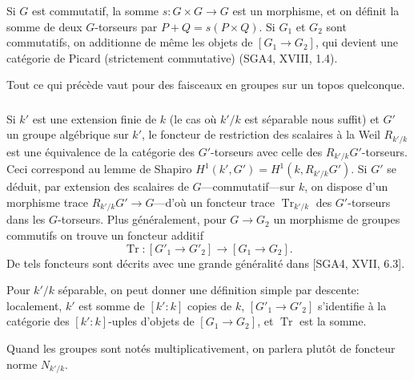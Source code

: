 \documentclass[12pt,a4paper]{article}
\theoremstyle{plain}
\theoremstyle{definition}
\theoremstyle{remark}
\DeclareMathOperator{\Tr}{Tr}
\begin{document}
Si $G$ est commutatif, la somme $s: G \times G \to G$ est un morphisme, et on d\'efinit la somme de deux $G$-torseurs par $P + Q = s(P \times Q)$. Si $G_1$ et $G_2$ sont commutatifs, on additionne de m\^eme les objets de $[G_1 \to G_2]$, qui devient une cat\'egorie de Picard (strictement commutative) (SGA4, XVIII, 1.4).

Tout ce qui pr\'ec\`ede vaut pour des faisceaux en groupes sur un topos quelconque.

\subsubsection{}

Si $k'$ est une extension finie de $k$ (le cas o\`u $k'/k$ est s\'eparable nous suffit) et $G'$ un groupe alg\'ebrique sur $k'$, le foncteur de restriction des scalaires \`a la Weil $R_{k'/k}$ est une \'equivalence de la cat\'egorie des $G'$-torseurs avec celle des $R_{k'/k}G'$-torseurs. Ceci correspond au lemme de Shapiro $H^1(k',G') = H^1(k,R_{k'/k}G')$. Si $G'$ se d\'eduit, par extension des scalaires de $G$---commutatif---sur $k$, on dispose d'un morphisme trace $R_{k'/k}G' \to G$---d'o\`u un foncteur trace $\Tr_{k'/k}$ des $G'$-torseurs dans les $G$-torseurs. Plus g\'en\'eralement, pour $G \to G_2$ un morphisme de groupes commutifs on trouve un foncteur additif
\begin{equation}\label{eq:2.4.6.1}
\Tr: [G'_1 \to G'_2] \to [G_1 \to G_2].
\end{equation}
De tels foncteurs sont d\'ecrits avec une grande g\'en\'eralit\'e dans [SGA4, XVII, 6.3].

Pour $k'/k$ s\'eparable, on peut donner une d\'efinition simple par descente: localement, $k'$ est somme de $[k':k]$ copies de $k$, $[G'_1 \to G'_2]$ s'identifie \`a la cat\'egorie des $[k':k]$-uples d'objets de $[G_1 \to G_2]$, et $\Tr$ est la somme.

Quand les groupes sont not\'es multiplicativement, on parlera plut\^ot de foncteur norme $N_{k'/k}$.

\subsubsection{}
\end{document}
